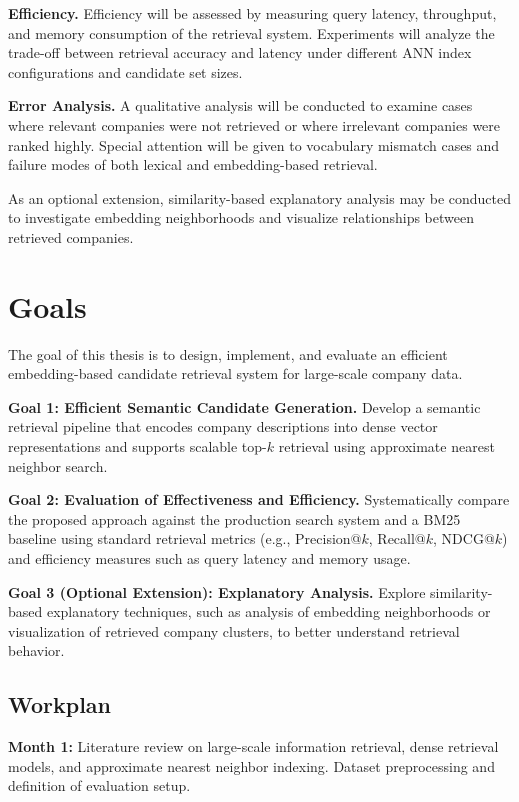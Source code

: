 \documentclass[a4paper]{scrartcl}
\begin{document}
\textbf{Efficiency.}
Efficiency will be assessed by measuring query latency, throughput, and memory consumption of the retrieval system. Experiments will analyze the trade-off between retrieval accuracy and latency under different ANN index configurations and candidate set sizes.

\textbf{Error Analysis.}
A qualitative analysis will be conducted to examine cases where relevant companies were not retrieved or where irrelevant companies were ranked highly. Special attention will be given to vocabulary mismatch cases and failure modes of both lexical and embedding-based retrieval.

As an optional extension, similarity-based explanatory analysis may be conducted to investigate embedding neighborhoods and visualize relationships between retrieved companies.

\section{Goals}

The goal of this thesis is to design, implement, and evaluate an efficient embedding-based candidate retrieval system for large-scale company data. %

\noindent \textbf{Goal 1: Efficient Semantic Candidate Generation.}  
Develop a semantic retrieval pipeline that encodes company descriptions into dense vector representations and supports scalable top-$k$ retrieval using approximate nearest neighbor search.

\noindent \textbf{Goal 2: Evaluation of Effectiveness and Efficiency.}  
Systematically compare the proposed approach against the production search system and a BM25 baseline using standard retrieval metrics (e.g., Precision@$k$, Recall@$k$, NDCG@$k$) and efficiency measures such as query latency and memory usage.

\noindent \textbf{Goal 3 (Optional Extension): Explanatory Analysis.}  
Explore similarity-based explanatory techniques, such as analysis of embedding neighborhoods or visualization of retrieved company clusters, to better understand retrieval behavior.

\subsection{Workplan}

\noindent \textbf{Month 1:}  
Literature review on large-scale information retrieval, dense retrieval models, and approximate nearest neighbor indexing. Dataset preprocessing and definition of evaluation setup.
\end{document}
